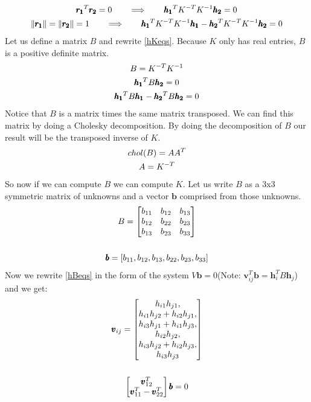 \begin{gather}
    \pmb{r_1}^T \pmb{r_2}=0 \qquad \Longrightarrow \qquad \pmb{h_1}^TK^{-T}K^{-1}\pmb{h_2}=0    \notag\\
    \|\pmb{r_1}\|=\|\pmb{r_2}\|=1 \qquad \Longrightarrow \qquad \pmb{h_1}^T K^{-T}K^{-1}\pmb{h_1}-\pmb{h_2}^TK^{-T}K^{-1}\pmb{h_2}=0
    \label{hKeqs}
\end{gather}
Let us define a matrix $B$ and rewrite \ref{hKeqs}. Because $K$ only has real entries, $B$ is a positive definite matrix.
\begin{gather}
    B=K^{-T} K^{-1} \label{Bdef} \\
    \pmb{h_1}^T B \pmb{h_2}=0 \notag\\
    \pmb{h_1}^T B \pmb{h_1}-\pmb{h_2}^T B \pmb{h_2}=0
    \label{hBeqs}
\end{gather}
Notice that $B$ is a matrix times the same matrix transposed. We can find this matrix by doing a Cholesky decomposition. By doing the decomposition of $B$ our result will be the transposed inverse of $K$.
\begin{gather}
    chol(B)=A A^T   \notag\\
    A=K^{-T}
    \label{cholesky}
\end{gather}
So now if we can compute $B$ we can compute $K$. Let us write $B$ as a 3x3 symmetric matrix of unknowns and a vector $\pmb{b}$ comprised from those unknowns.
\begin{gather}
    B = \begin{bmatrix}
        b_{11} & b_{12} & b_{13} \\
        b_{12} & b_{22} & b_{23} \\
        b_{13} & b_{23} & b_{33} \\
    \end{bmatrix}   \notag\\\notag\\
    \pmb{b} = [b_{11}, b_{12}, b_{13}, b_{22}, b_{23}, b_{33}]\notag
\end{gather}
Now we rewrite \ref{hBeqs} in the form of the system $V\pmb{b}=0$(Note: $\pmb{v}_{ij}^T \pmb{b}=\pmb{h}_i^T B \pmb{h}_j$) and we get:
\begin{gather}
    \pmb{v}_{ij} = \begin{bmatrix}
        h_{i1}h_{j1},   \\
        h_{i1}h_{j2}+h_{i2}h_{j1},  \\
        h_{i3}h_{j1}+h_{i1}h_{j3},  \\
        h_{i2}h_{j2},   \\
        h_{i3}h_{j2}+h_{i2}h_{j3},  \\
        h_{i3}h_{j3}    
    \end{bmatrix}   \notag\\
    \notag\\
    \begin{bmatrix}
        \pmb{v}_{12}^T \\
        \pmb{v}_{11}^T-\pmb{v}_{22}^T
    \end{bmatrix}
    \pmb{b}=0
    \label{vsistem}
\end{gather}

